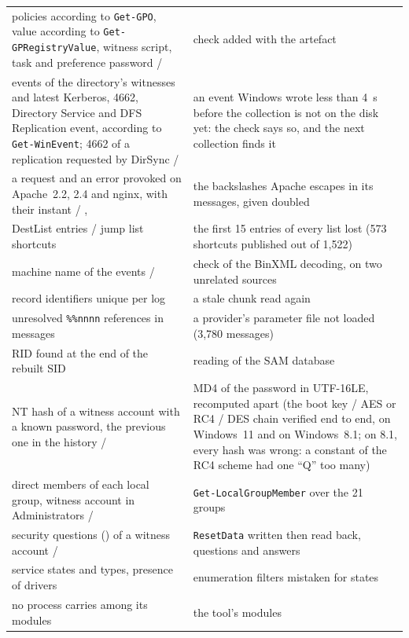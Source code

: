 \documentclass[11pt,a4paper,oneside]{report}
\begin{document}
\begin{longtable}{@{}L{6.6cm}L{8.4cm}@{}}
policies according to \texttt{Get-GPO}, value according to
  \texttt{Get-GPRegistryValue}, witness script, task and preference password /
   & check added with the artefact \\
events of the directory's witnesses and latest Kerberos, 4662, Directory
  Service and DFS Replication event, according to \texttt{Get-WinEvent}; 4662 of
  a replication requested by DirSync /  & an event Windows
  wrote less than 4~s before the collection is not on the disk yet: the check
  says so, and the next collection finds it \\
a request and an error provoked on Apache~2.2, 2.4 and nginx, with their
  instant / ,
   &
  the backslashes Apache escapes in its messages, given doubled \\
DestList entries / jump list shortcuts & the first 15 entries of every list
  lost (573 shortcuts published out of 1,522) \\
machine name of the events /  & check of the
  BinXML decoding, on two unrelated sources \\
record identifiers unique per log & a stale chunk read again \\
unresolved \texttt{\%\%nnnn} references in messages & a provider's parameter
  file not loaded (3,780 messages) \\
RID found at the end of the rebuilt SID & reading of the SAM database \\
NT hash of a witness account with a known password, the previous one in the
  history /  & MD4 of the password in UTF-16LE, recomputed
  apart (the boot key / AES or RC4 / DES chain verified end to end, on
  Windows~11 and on Windows~8.1; on 8.1, every hash was wrong: a constant of
  the RC4 scheme had one ``Q'' too many) \\
direct members of each local group, witness account in Administrators /
   & \texttt{Get-LocalGroupMember} over the 21 groups \\
security questions () of a witness account /
   & \texttt{ResetData} written then read back, questions and answers \\
service states and types, presence of drivers & enumeration filters mistaken
  for states \\
no process carries  among its modules & the tool's modules

\end{longtable}
\end{document}
